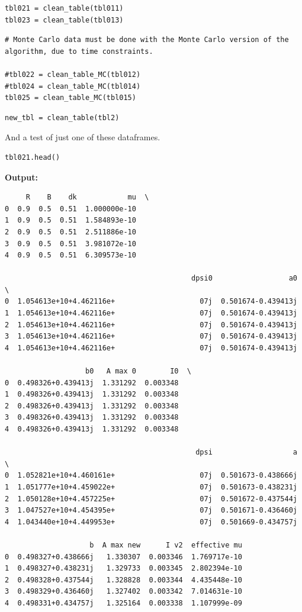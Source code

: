 \documentclass{article}
\begin{document}
\begin{lstlisting}
tbl021 = clean_table(tbl011)
tbl023 = clean_table(tbl013)\end{lstlisting}

\begin{lstlisting}
# Monte Carlo data must be done with the Monte Carlo version of the algorithm, due to time constraints.

#tbl022 = clean_table_MC(tbl012)
#tbl024 = clean_table_MC(tbl014)
tbl025 = clean_table_MC(tbl015)\end{lstlisting}

\begin{lstlisting}
new_tbl = clean_table(tbl2)\end{lstlisting}

And a test of just one of these dataframes.

\begin{lstlisting}
tbl021.head()\end{lstlisting}

\textbf{Output:}\begin{verbatim}
     R    B    dk            mu  \
0  0.9  0.5  0.51  1.000000e-10   
1  0.9  0.5  0.51  1.584893e-10   
2  0.9  0.5  0.51  2.511886e-10   
3  0.9  0.5  0.51  3.981072e-10   
4  0.9  0.5  0.51  6.309573e-10   

                                            dpsi0                  a0  \
0  1.054613e+10+4.462116e+                    07j  0.501674-0.439413j   
1  1.054613e+10+4.462116e+                    07j  0.501674-0.439413j   
2  1.054613e+10+4.462116e+                    07j  0.501674-0.439413j   
3  1.054613e+10+4.462116e+                    07j  0.501674-0.439413j   
4  1.054613e+10+4.462116e+                    07j  0.501674-0.439413j   

                   b0   A max 0        I0  \
0  0.498326+0.439413j  1.331292  0.003348   
1  0.498326+0.439413j  1.331292  0.003348   
2  0.498326+0.439413j  1.331292  0.003348   
3  0.498326+0.439413j  1.331292  0.003348   
4  0.498326+0.439413j  1.331292  0.003348   

                                             dpsi                   a  \
0  1.052821e+10+4.460161e+                    07j  0.501673-0.438666j   
1  1.051777e+10+4.459022e+                    07j  0.501673-0.438231j   
2  1.050128e+10+4.457225e+                    07j  0.501672-0.437544j   
3  1.047527e+10+4.454395e+                    07j  0.501671-0.436460j   
4  1.043440e+10+4.449953e+                    07j  0.501669-0.434757j   

                    b  A max new      I v2  effective mu  
0  0.498327+0.438666j   1.330307  0.003346  1.769717e-10  
1  0.498327+0.438231j   1.329733  0.003345  2.802394e-10  
2  0.498328+0.437544j   1.328828  0.003344  4.435448e-10  
3  0.498329+0.436460j   1.327402  0.003342  7.014631e-10  
4  0.498331+0.434757j   1.325164  0.003338  1.107999e-09  
\end{verbatim}
\end{document}
